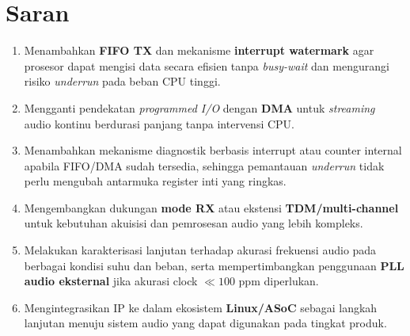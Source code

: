 \section{Saran}

\begin{enumerate}
    \item Menambahkan \textbf{FIFO TX} dan mekanisme \textbf{interrupt watermark} agar
    prosesor dapat mengisi data secara efisien tanpa \textit{busy-wait} dan mengurangi
    risiko \textit{underrun} pada beban CPU tinggi.

    \item Mengganti pendekatan \textit{programmed I/O} dengan \textbf{DMA} untuk
    \textit{streaming} audio kontinu berdurasi panjang tanpa intervensi CPU.

    \item Menambahkan mekanisme diagnostik berbasis interrupt atau counter internal
    apabila FIFO/DMA sudah tersedia, sehingga pemantauan \textit{underrun} tidak
    perlu mengubah antarmuka register inti yang ringkas.

    \item Mengembangkan dukungan \textbf{mode RX} atau ekstensi \textbf{TDM/multi-channel}
    untuk kebutuhan akuisisi dan pemrosesan audio yang lebih kompleks.

    \item Melakukan karakterisasi lanjutan terhadap akurasi frekuensi audio pada berbagai
    kondisi suhu dan beban, serta mempertimbangkan penggunaan \textbf{PLL audio eksternal}
    jika akurasi clock $\ll 100$ ppm diperlukan.

    \item Mengintegrasikan IP ke dalam ekosistem \textbf{Linux/ASoC} sebagai langkah
    lanjutan menuju sistem audio yang dapat digunakan pada tingkat produk.
\end{enumerate}

